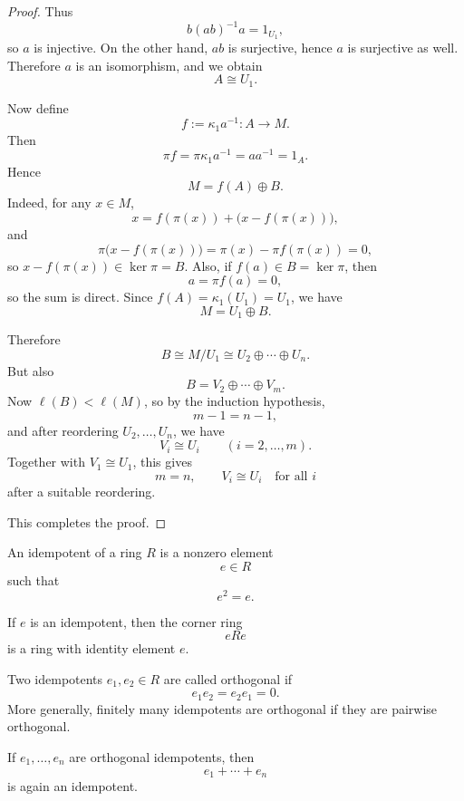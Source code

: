 \begin{proof}
    Thus
    \[
        b(ab)^{-1}a=1_{U_1},
    \]
    so $a$ is injective. On the other hand, $ab$ is surjective, hence $a$ is surjective as well.
    Therefore $a$ is an isomorphism, and we obtain
    \[
        A\cong U_1.
    \]

    Now define
    \[
        f:=\kappa_1 a^{-1}:A\to M.
    \]
    Then
    \[
        \pi f=\pi\kappa_1 a^{-1}=aa^{-1}=1_A.
    \]
    Hence
    \[
        M=f(A)\oplus B.
    \]
    Indeed, for any $x\in M$,
    \[
        x=f(\pi(x))+\bigl(x-f(\pi(x))\bigr),
    \]
    and
    \[
        \pi\bigl(x-f(\pi(x))\bigr)=\pi(x)-\pi f(\pi(x))=0,
    \]
    so $x-f(\pi(x))\in \ker\pi=B$. Also, if $f(a)\in B=\ker\pi$, then
    \[
        a=\pi f(a)=0,
    \]
    so the sum is direct. Since $f(A)=\kappa_1(U_1)=U_1$, we have
    \[
        M=U_1\oplus B.
    \]

    Therefore
    \[
        B\cong M/U_1\cong U_2\oplus\cdots\oplus U_n.
    \]
    But also
    \[
        B=V_2\oplus\cdots\oplus V_m.
    \]
    Now $\ell(B)<\ell(M)$, so by the induction hypothesis,
    \[
        m-1=n-1,
    \]
    and after reordering $U_2,\dots,U_n$, we have
    \[
        V_i\cong U_i \qquad (i=2,\dots,m).
    \]
    Together with $V_1\cong U_1$, this gives
    \[
        m=n,
        \qquad
        V_i\cong U_i \quad\text{for all } i
    \]
    after a suitable reordering.

    This completes the proof.
\end{proof}

\begin{definition}
    An idempotent of a ring $R$ is a nonzero element
    \[
        e \in R
    \]
    such that
    \[
        e^2=e.
    \]
\end{definition}

\begin{remark}
    If $e$ is an idempotent, then the corner ring
    \[
        eRe
    \]
    is a ring with identity element $e$.
\end{remark}

\begin{definition}
    Two idempotents $e_1,e_2 \in R$ are called orthogonal if
    \[
        e_1 e_2 = e_2 e_1 = 0.
    \]
    More generally, finitely many idempotents are orthogonal if they are pairwise orthogonal.
\end{definition}

\begin{lemma}
    If $e_1,\dots,e_n$ are orthogonal idempotents, then
    \[
        e_1+\cdots+e_n
    \]
    is again an idempotent.
\end{lemma}

